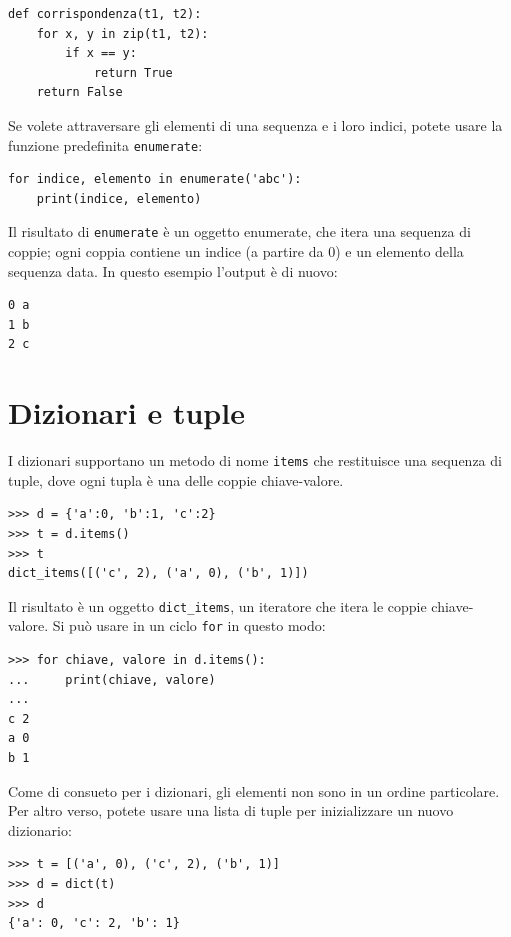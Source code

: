 \documentclass[10pt]{book}
\begin{document}
\begin{verbatim}
def corrispondenza(t1, t2):
    for x, y in zip(t1, t2):
        if x == y:
            return True
    return False
\end{verbatim}
%
Se volete attraversare gli elementi di una sequenza e i loro indici, potete usare la funzione predefinita {\tt enumerate}:

\begin{verbatim}
for indice, elemento in enumerate('abc'):
    print(indice, elemento)
\end{verbatim}
%
Il risultato di {\tt enumerate} è un oggetto enumerate, che itera una sequenza di coppie; ogni coppia contiene un indice (a partire da 0) e un elemento della sequenza data.
In questo esempio l'output è di nuovo:

\begin{verbatim}
0 a
1 b
2 c
\end{verbatim}
%
%


\section{Dizionari e tuple}
\label{dictuple}

I dizionari supportano un metodo di nome {\tt items} che restituisce una sequenza di tuple, dove ogni tupla è una delle coppie chiave-valore.

\begin{verbatim}
>>> d = {'a':0, 'b':1, 'c':2}
>>> t = d.items()
>>> t
dict_items([('c', 2), ('a', 0), ('b', 1)])
\end{verbatim}
%
Il risultato è un oggetto \verb"dict_items", un iteratore che itera le coppie chiave-valore. Si può usare in un ciclo {\tt for} in questo modo:

\begin{verbatim}
>>> for chiave, valore in d.items():
...     print(chiave, valore)
...
c 2
a 0
b 1
\end{verbatim}

Come di consueto per i dizionari, gli elementi non sono in un ordine particolare.
Per altro verso, potete usare una lista di tuple per inizializzare un nuovo dizionario: 

\begin{verbatim}
>>> t = [('a', 0), ('c', 2), ('b', 1)]
>>> d = dict(t)
>>> d
{'a': 0, 'c': 2, 'b': 1}
\end{verbatim}
\end{document}
